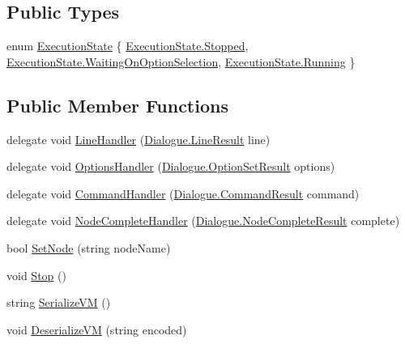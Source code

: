 \subsection*{Public Types}
\begin{DoxyCompactItemize}
\item 
enum \hyperlink{a00072_add28fa9c8a45ca579e84d05920bbc42d}{Execution\-State} \{ \hyperlink{a00072_add28fa9c8a45ca579e84d05920bbc42dac23e2b09ebe6bf4cb5e2a9abe85c0be2}{Execution\-State.\-Stopped}, 
\hyperlink{a00072_add28fa9c8a45ca579e84d05920bbc42da74a2a0b3a4597e7a50714f9cea34772b}{Execution\-State.\-Waiting\-On\-Option\-Selection}, 
\hyperlink{a00072_add28fa9c8a45ca579e84d05920bbc42da5bda814c4aedb126839228f1a3d92f09}{Execution\-State.\-Running}
 \}
\end{DoxyCompactItemize}
\subsection*{Public Member Functions}
\begin{DoxyCompactItemize}
\item 
delegate void \hyperlink{a00072_aac9ec1011ea2c01460044d7c8355f398}{Line\-Handler} (\hyperlink{a00050}{Dialogue.\-Line\-Result} line)
\item 
delegate void \hyperlink{a00072_a78dfd54b743e53078eed19ab7be2b6cf}{Options\-Handler} (\hyperlink{a00060}{Dialogue.\-Option\-Set\-Result} options)
\item 
delegate void \hyperlink{a00072_a1b57359378059b134ba76acddafd8d81}{Command\-Handler} (\hyperlink{a00027}{Dialogue.\-Command\-Result} command)
\item 
delegate void \hyperlink{a00072_a5bf3aa51578847c18191fec665a840f9}{Node\-Complete\-Handler} (\hyperlink{a00055}{Dialogue.\-Node\-Complete\-Result} complete)
\item 
bool \hyperlink{a00072_a6364593ea1115d65e34b343422cfbbbd}{Set\-Node} (string node\-Name)
\item 
void \hyperlink{a00072_a78b8c4078471af59ba505c28824d84d1}{Stop} ()
\item 
string \hyperlink{a00072_ae66d8c267611573b649233f511beb646}{Serialize\-V\-M} ()
\item 
void \hyperlink{a00072_a52055e419ba627f0788ad3f6d0f9cb1c}{Deserialize\-V\-M} (string encoded)
\end{DoxyCompactItemize}
